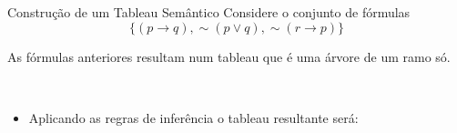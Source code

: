 \begin{frame}{Construção de um Tableau Semântico}
Considere o conjunto de fórmulas
$$\{(p \rightarrow q),\sim(p \vee q), \sim(r \rightarrow p)\}$$

As fórmulas anteriores resultam num tableau que é uma árvore de um ramo só.

\vspace{0,7 cm}
\centering
{}   \\
\vspace{0,7 cm}
\begin{itemize}
\item Aplicando as regras de inferência o tableau resultante será:
\end{itemize}
\end{frame}

